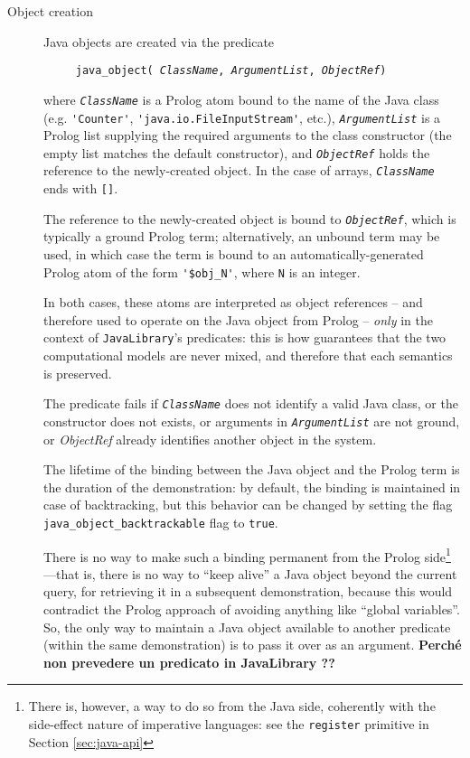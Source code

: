 \begin{description}
  \item [Object creation]
        Java objects are created via the predicate
        
        \texttt{~~~~~java\_object(%
                 \textit{ClassName}, \textit{ArgumentList}, \textit{ObjectRef})}
        
        where \texttt{\textit{ClassName}} is a Prolog atom bound to the name of the
        Java class (e.g. \verb|'Counter'|, \verb|'java.io.FileInputStream'|, etc.), \texttt{\textit{ArgumentList}} is a Prolog list supplying the required arguments to the class constructor (the empty list matches the default constructor), and \texttt{\textit{ObjectRef}} holds the reference to the newly-created object.
        In the case of arrays, \texttt{\textit{ClassName}} ends with \texttt{[]}.
        
        The reference to the newly-created object is bound to \texttt{\textit{ObjectRef}},
        which is typically a ground Prolog term; alternatively, an unbound term
        may be used, in which case the term is bound to an automatically-generated
        Prolog atom of the form \verb|'$obj_N'|, where \texttt{N} is an integer.

        In both cases, these atoms are interpreted as object references --
        and therefore used to operate on the Java object from Prolog -- \textit{only} in the context of \texttt{JavaLibrary}'s predicates: this is how \tuprolog{} guarantees that the two computational models are never mixed, and therefore that each semantics is preserved.

        The predicate fails if \texttt{\textit{ClassName}} does not identify a valid Java class, or the constructor does not exists, or arguments in
        \texttt{\textit{ArgumentList}} are not ground, or \textit{ObjectRef}
        already identifies another object in the system.

        The lifetime of the binding between the Java object and the Prolog term
        is the duration of the demonstration: by default, the binding is maintained in case of backtracking, but this behavior can be changed by setting the flag \texttt{java\_object\_backtrackable} flag to \texttt{true}.
        
        \color{red}
        There is no way to make such a binding permanent from the Prolog side\footnote{\color{red} There is, however, a way to do so from the Java side, coherently with the side-effect nature of imperative languages: see the \texttt{register} primitive in Section \ref{sec:java-api}}---that is, there is no way to ``keep alive'' a Java object beyond the current query, for retrieving it in a subsequent demonstration, because this would contradict the Prolog approach of avoiding anything like ``global variables''. So, the only way to maintain a Java object available to another predicate (within the same demonstration) is to pass it over as an argument.
        \textbf{Perch\'{e} non prevedere un predicato in JavaLibrary ??}
        \normalcolor


\end{description}
